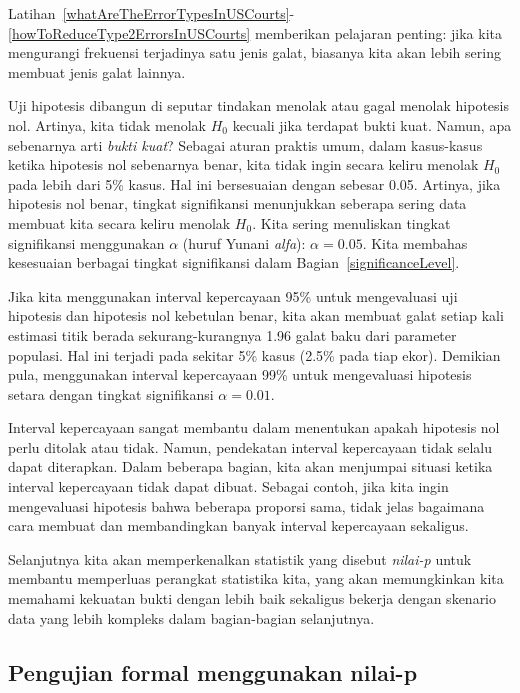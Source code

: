 
Latihan~\ref{whatAreTheErrorTypesInUSCourts}-\ref{howToReduceType2ErrorsInUSCourts} memberikan
pelajaran penting: jika kita mengurangi frekuensi terjadinya
satu jenis galat, biasanya kita akan lebih sering membuat
jenis galat lainnya.

Uji hipotesis dibangun di seputar tindakan menolak atau gagal
menolak hipotesis nol.
Artinya, kita tidak menolak $H_0$ kecuali jika terdapat bukti kuat.
Namun, apa sebenarnya arti \emph{bukti kuat}?
Sebagai aturan praktis umum, dalam kasus-kasus ketika hipotesis nol
sebenarnya benar, kita tidak ingin secara keliru
menolak $H_0$ pada lebih dari 5\% kasus.
Hal ini bersesuaian dengan %
 sebesar 0.05.
Artinya, jika hipotesis nol benar,
tingkat signifikansi menunjukkan seberapa sering
data membuat kita secara keliru menolak $H_0$.
Kita sering menuliskan tingkat signifikansi menggunakan $\alpha$
(huruf Yunani \emph{alfa}):
$\alpha = 0.05$.
Kita membahas kesesuaian berbagai tingkat signifikansi
dalam Bagian~\ref{significanceLevel}.


Jika kita menggunakan interval kepercayaan 95\% untuk mengevaluasi
uji hipotesis dan hipotesis nol kebetulan benar,
kita akan membuat galat setiap kali estimasi titik berada
sekurang-kurangnya 1.96 galat baku dari parameter
populasi.
Hal ini terjadi pada sekitar 5\% kasus (2.5\% pada tiap ekor).
Demikian pula, menggunakan interval kepercayaan 99\% untuk mengevaluasi
hipotesis setara dengan tingkat signifikansi
$\alpha = 0.01$.

Interval kepercayaan sangat membantu dalam menentukan
apakah hipotesis nol perlu ditolak atau tidak.
Namun, pendekatan interval kepercayaan tidak selalu
dapat diterapkan.
Dalam beberapa bagian, kita akan menjumpai situasi ketika
interval kepercayaan tidak dapat dibuat.
Sebagai contoh, jika kita ingin mengevaluasi hipotesis
bahwa beberapa proporsi sama, tidak jelas bagaimana
cara membuat dan membandingkan banyak interval kepercayaan
sekaligus.

Selanjutnya kita akan memperkenalkan statistik yang disebut \emph{nilai-p}
untuk membantu memperluas perangkat statistika kita, yang akan
memungkinkan kita memahami kekuatan bukti dengan lebih baik sekaligus
bekerja dengan skenario data yang lebih kompleks dalam
bagian-bagian selanjutnya.
\subsection{Pengujian formal menggunakan nilai-p}

